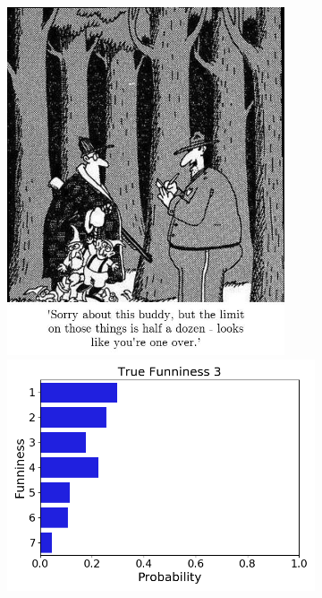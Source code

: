 \documentclass[draft,final,oneside]{vutinfth} %
\begin{document}
\begin{figure}
\begin{subfigure}[b]{0.45\textwidth}
\centering
\includegraphics[width=0.9\textwidth,height=0.3\textheight,keepaspectratio]{graphics/detail/Test_for_Image_3_cartoon} \\
\includegraphics[width=1.0\textwidth]{graphics/detail/Test_for_Image_3}

\end{subfigure}
\end{figure}
\end{document}
